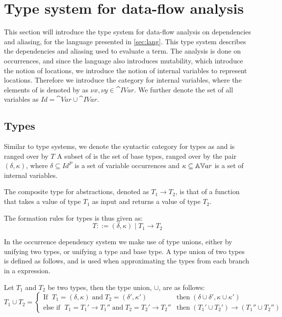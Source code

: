 \documentclass[../../master.tex]{subfiles}
\begin{document}
\section{Type system for data-flow analysis}
This section will introduce the type system for data-flow analysis on dependencies and aliasing, for the language presented in \cref{sec:lang}.
This type system describes the dependencies and aliasing used to evaluate a term.
The analysis is done on occurrences, and since the language also introduces mutability, which introduce the notion of locations, we introduce the notion of internal variables to represent locations.
Therefore we introduce the category  for internal variables, where the elements of  is denoted by as $\nu x,\nu y\in\cat{IVar}$.
We further denote the set of all variables as $Id=\cat{Var}\cup\cat{IVar}$.

\subsection{Types}
Similar to type systems, we denote the syntactic category for types as  and is ranged over by $T$
A subset of  is the set of base types, ranged over by the pair $(\delta,\kappa)$, where $\delta\subseteq Id^P$ is a set of variable occurrences and $\kappa\subseteq\mathbb{AV}ar$ is a set of internal variables.

The composite type for abstractions, denoted as $T_1\rightarrow T_2$, is that of a function that takes a value of type $T_1$ as input and returns a value of type $T_2$.

The formation rules for types is thus given as:
$$T::=(\delta,\kappa)\mid T_1 \rightarrow T_2$$

In the occurrence dependency system we make use of type unions, either by unifying two types, or unifying a type and base type.
A type union of two types is defined as follows, and is used when approximating the types from each branch in a  expression.
\begin{definition}
	Let $T_1$ and $T_2$ be two types, then the type union, $\cup$, are as follows:
	\begin{equation*}
		T_1\cup T_2=
		\left\{\begin{matrix}
			\mbox{If } \; T_1=(\delta,\kappa) \;\mbox{and}\; T_2=(\delta',\kappa')  & \mbox{then} \; (\delta\cup\delta',\kappa\cup\kappa')\\
			\mbox{else if } \; T_1=T_1'\rightarrow T_1''\;\mbox{and}\;T_2=T_2'\rightarrow T_2'' & \mbox{then} \; (T_1'\cup T_2')\rightarrow (T_1''\cup T_2'')
		\end{matrix}\right.
	\end{equation*}
\end{definition}
\end{document}

